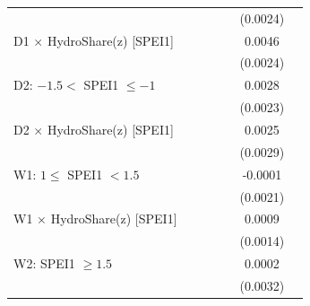 {\begin{tabular}{l*{6}{c}}
                    &                     &                     &                     &                     &    (0.0024)         &                     \\
\addlinespace
D1 $\times$ HydroShare(z) [SPEI1]&                     &                     &                     &                     &      0.0046\sym{*}  &                     \\
                    &                     &                     &                     &                     &    (0.0024)         &                     \\
\addlinespace
D2: $-1.5 <$ SPEI1 $\leq -1$&                     &                     &                     &                     &      0.0028         &                     \\
                    &                     &                     &                     &                     &    (0.0023)         &                     \\
\addlinespace
D2 $\times$ HydroShare(z) [SPEI1]&                     &                     &                     &                     &      0.0025         &                     \\
                    &                     &                     &                     &                     &    (0.0029)         &                     \\
\addlinespace
W1: $1 \leq$ SPEI1 $< 1.5$&                     &                     &                     &                     &     -0.0001         &                     \\
                    &                     &                     &                     &                     &    (0.0021)         &                     \\
\addlinespace
W1 $\times$ HydroShare(z) [SPEI1]&                     &                     &                     &                     &      0.0009         &                     \\
                    &                     &                     &                     &                     &    (0.0014)         &                     \\
\addlinespace
W2: SPEI1 $\geq 1.5$&                     &                     &                     &                     &      0.0002         &                     \\
                    &                     &                     &                     &                     &    (0.0032)         &                     \\

\end{tabular}}
